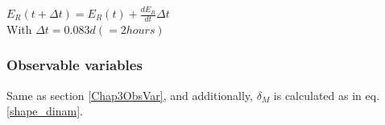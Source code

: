 $E_{R}\left ( t + \Delta t \right ) = E_{R}\left ( t \right ) + \frac{dE_{R}}{dt}\Delta t$ \\

With $\Delta t = 0.083 d \left (=2hours\right )$

\subsubsection{Observable variables}\label{Chap4ObsVar}
Same as section \ref{Chap3ObsVar}, and additionally, $\delta_{M}$ is calculated as in eq. \ref{shape_dinam}.





%
%
%
%
%
%
%
%

